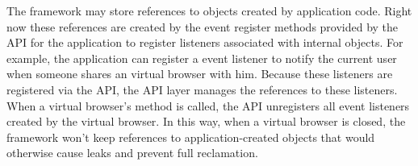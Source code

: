 The framework may store references to objects created by application
code.  Right now these references are created by the event register methods
provided by the API for the application to register listeners associated with internal
objects. For example, the application can register a event listener to notify
the current user when someone shares an virtual browser with him.  Because these
listeners are registered via the API, the API layer manages the references to these
listeners. When a virtual browser's  method is called, the API
unregisters all event listeners created by the virtual browser. In this
way, when a virtual browser is closed, the framework won't keep references
to application-created objects that would otherwise cause leaks and prevent
full reclamation.


